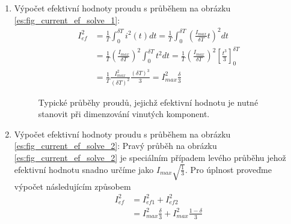    \begin{enumerate}[noitemsep]
      \item Výpočet efektivní hodnoty proudu s průběhem na obrázku \ref{es:fig_current_ef_solve_1}:
        {\footnotesize
          \begin{align}\label{es:eq_Ief1_solve}
            I_{ef}^2 &= \frac{1}{T}\int_0^{\delta T}i^2(t)dt=
                        \frac{1}{T}\int_0^{\delta T}
                                          {\left(\frac{I_{max}}{\delta T}t\right)^2}dt \nonumber \\ 
                     &= \frac{1}{T}\left(\frac{I_{max}}{\delta T}\right)^2
                        \int_0^{\delta T}{t^2}dt =
                        \frac{1}{T}\left(\frac{I_{max}}{\delta T}\right)^2
                                   \left[\frac{t^3}{3}\right]_0^{\delta T}             \nonumber \\ 
                     &= \frac{1}{T}\frac{I_{max}^2}{(\delta T)^2}
                        \frac{(\delta T)^3}{3}=I_{max}^2\frac{\delta}{3}
          \end{align}
        } %
        \begin{figure}[hp!]
          \centering
            {}
            {}
          \caption{Typické průběhy proudů, jejichž efektivní hodnotu je nutné stanovit při 
                   dimenzování vinutých komponent.}
          \label{es:fig_Ief_solve1}
        \end{figure}
      \item Výpočet efektivní hodnoty proudu s průběhem na obrázku \ref{es:fig_current_ef_solve_2}:
            Pravý průběh na obrázku \ref{es:fig_current_ef_solve_2} je speciálním případem levého
            průběhu jehož efektivní hodnotu snadno určíme jako $I_{max}\sqrt{\frac{1}{3}}$. Pro
            úplnost proveďme výpočet následujícím způsobem
        \begin{align}\label{es:eq_Ief2_solve}
          I_{ef}^2 &= I_{ef1}^2+I_{ef2}^2                                   \nonumber \\
                   &= I_{max}^2\frac{\delta}{3}+I_{max}^2\frac{1-\delta}{3}

\end{align}
\end{enumerate}
